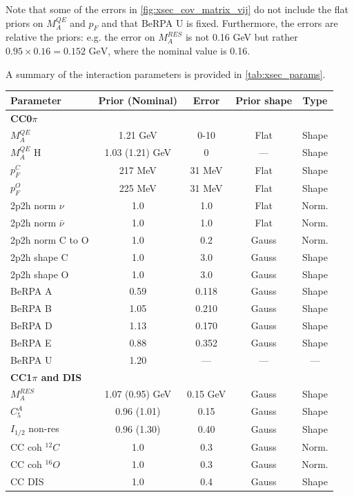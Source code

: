Note that some of the errors in \autoref{fig:xsec_cov_matrix_vij} do not include the flat priors on $M_A^{QE}$ and $p_F$ and that BeRPA U is fixed. Furthermore, the errors are relative the priors: e.g. the error on $M_A^{RES}$ is not 0.16 GeV but rather $0.95\times0.16=0.152\text{ GeV}$, where the nominal value is 0.16.

A summary of the interaction parameters is provided in \autoref{tab:xsec_params}.
\begin{table}
	\begin{tabular}{l | c c c c }
		\hline
		\hline
		Parameter & Prior (Nominal) & Error & Prior shape & Type \\
		\hline
		\textbf{CC0$\pi$} & & & & \\
		$M_A^{QE}$ & 1.21 GeV & 0-10 & Flat & Shape \\
		$M_A^{QE}$ H & 1.03 (1.21) GeV & 0 & --- & Shape \\
		$p_F^C$ & 217 MeV & 31 MeV & Flat & Shape \\
		$p_F^O$ & 225 MeV & 31 MeV & Flat & Shape \\
		2p2h norm $\nu$ & 1.0 & 1.0 & Flat & Norm. \\
		2p2h norm $\bar{\nu}$ & 1.0 & 1.0 & Flat & Norm. \\
		2p2h norm C to O & 1.0 & 0.2 & Gauss & Norm. \\
		2p2h shape C & 1.0 & 3.0 & Gauss & Shape \\
		2p2h shape O & 1.0 & 3.0 & Gauss & Shape \\ 
		BeRPA A & 0.59 & 0.118 & Gauss & Shape \\
		BeRPA B & 1.05 & 0.210 & Gauss & Shape \\
		BeRPA D & 1.13 & 0.170 & Gauss & Shape \\
		BeRPA E & 0.88 & 0.352 & Gauss & Shape \\
		BeRPA U & 1.20 & --- & --- & --- \\
		\hline
		\textbf{CC1$\pi$ and DIS} & & & & \\
		$M_A^{RES}$ & 1.07 (0.95) GeV & 0.15 GeV & Gauss & Shape \\
		$C_5^A$ & 0.96 (1.01) & 0.15 & Gauss & Shape \\
		$I_{1/2}$ non-res & 0.96 (1.30) & 0.40 & Gauss & Shape \\
		CC coh $^{12}C$ & 1.0 & 0.3 & Gauss & Norm. \\
		CC coh $^{16}O$ & 1.0 & 0.3 & Gauss & Norm. \\
		CC DIS & 1.0 & 0.4 & Gauss & Shape \\

\end{tabular}
\end{table}
